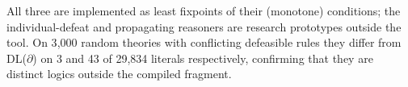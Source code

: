 All three are implemented as least fixpoints of their (monotone) conditions; the individual-defeat and propagating reasoners are research prototypes outside the tool. On 3{,}000 random theories with conflicting defeasible rules they differ from DL($\partial$) on 3 and 43 of 29{,}834 literals respectively, confirming that they are distinct logics outside the compiled fragment.
